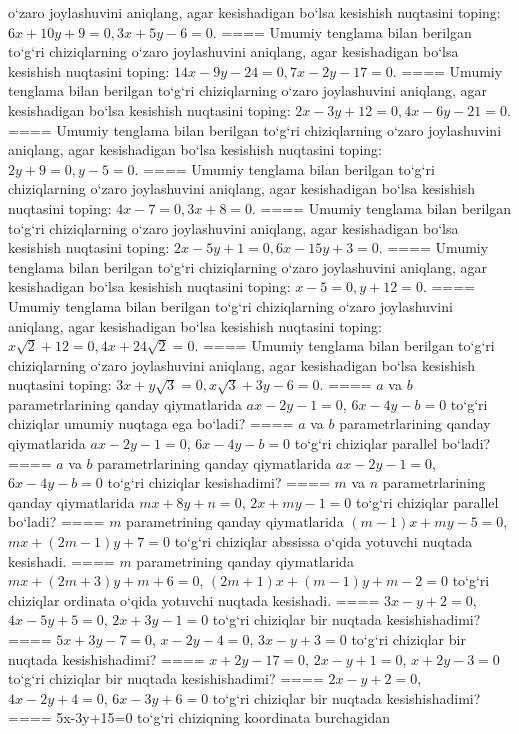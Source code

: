 o‘zaro joylashuvini aniqlang, agar kesishadigan bo‘lsa kesishish nuqtasini
toping: $6x+10y+9=0, 3x+5y-6=0$.
====
Umumiy tenglama bilan berilgan to‘g‘ri chiziqlarning
o‘zaro joylashuvini aniqlang, agar kesishadigan bo‘lsa kesishish nuqtasini
toping: $14x-9y-24=0, 7x-2y-17=0$.
====
Umumiy tenglama bilan berilgan to‘g‘ri chiziqlarning
o‘zaro joylashuvini aniqlang, agar kesishadigan bo‘lsa kesishish nuqtasini
toping: $2x-3y+12=0, 4x-6y-21=0$.
====
Umumiy tenglama bilan berilgan to‘g‘ri chiziqlarning
o‘zaro joylashuvini aniqlang, agar kesishadigan bo‘lsa kesishish nuqtasini
toping: $2y+9=0, y-5=0$.
====
Umumiy tenglama bilan berilgan to‘g‘ri chiziqlarning
o‘zaro joylashuvini aniqlang, agar kesishadigan bo‘lsa kesishish nuqtasini
toping: $4x-7=0, 3x+8=0$.
====
Umumiy tenglama bilan berilgan to‘g‘ri chiziqlarning
o‘zaro joylashuvini aniqlang, agar kesishadigan bo‘lsa kesishish nuqtasini
toping: $2x-5y+1=0, 6x-15y+3=0$.
====
Umumiy tenglama bilan berilgan to‘g‘ri chiziqlarning
o‘zaro joylashuvini aniqlang, agar kesishadigan bo‘lsa kesishish nuqtasini
toping: $x-5=0, y+12=0$.
====
Umumiy tenglama bilan berilgan to‘g‘ri chiziqlarning
o‘zaro joylashuvini aniqlang, agar kesishadigan bo‘lsa kesishish nuqtasini
toping: $x\sqrt{2}+12=0, 4x+24\sqrt{2}=0$.
====
Umumiy tenglama bilan berilgan to‘g‘ri chiziqlarning
o‘zaro joylashuvini aniqlang, agar kesishadigan bo‘lsa kesishish nuqtasini
toping: $3x+y\sqrt{3}=0, x\sqrt{3}+3y-6=0$.
====
$a$ va $b$ parametrlarining qanday qiymatlarida
$ax-2y-1=0$, $6x-4y-b=0$ to‘g‘ri chiziqlar umumiy nuqtaga ega bo‘ladi?
====
$a$ va $b$ parametrlarining qanday qiymatlarida
$ax-2y-1=0$, $6x-4y-b=0$ to‘g‘ri chiziqlar parallel bo‘ladi?
====
$a$ va $b$ parametrlarining qanday qiymatlarida
$ax-2y-1=0$, $6x-4y-b=0$ to‘g‘ri chiziqlar kesishadimi?
====
$m$ va $n$ parametrlarining qanday qiymatlarida
$mx+8y+n=0$, $2x+my-1=0$ to‘g‘ri chiziqlar parallel bo‘ladi?
====
$m$ parametrining qanday qiymatlarida
$ (m-1) x+my-5=0$, $mx+ (2m-1) y+7=0$ to‘g‘ri chiziqlar abssissa
o‘qida yotuvchi nuqtada kesishadi.
====
$m$ parametrining qanday qiymatlarida
$mx+ (2m+3) y+m+6=0$, $ (2m+1) x+ (m-1) y+m-2=0$ to‘g‘ri chiziqlar ordinata
o‘qida yotuvchi nuqtada kesishadi.
====
$3x-y+2=0$, $4x-5y+5=0$, $2x+3y-1=0$
to‘g‘ri chiziqlar bir nuqtada kesishishadimi?
====
$5x+3y-7=0$, $x-2y-4=0$, $3x-y+3=0$
to‘g‘ri chiziqlar bir nuqtada kesishishadimi?
====
$x+2y-17=0$, $2x-y+1=0$, $x+2y-3=0$
to‘g‘ri chiziqlar bir nuqtada kesishishadimi?
====
$2x-y+2=0$, $4x-2y+4=0$, $6x-3y+6=0$
to‘g‘ri chiziqlar bir nuqtada kesishishadimi?
====
5x-3y+15=0 to‘g‘ri chiziqning koordinata burchagidan
